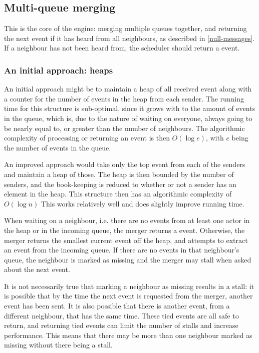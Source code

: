 \subsection{Multi-queue merging} \label{rustasim-tree}

This is the core of the engine: merging multiple queues together, and returning the next event if it has heard from all neighbours, as described in \ref{null-messages}.
If a neighbour has not been heard from, the scheduler should return a  event.

\subsubsection{An initial approach: heaps}
An initial approach might be to maintain a heap of all received event along with a counter for the number of events in the heap from each sender.
The running time for this structure is sub-optimal, since it grows with to the amount of events in the queue, which is, due to the nature of waiting on everyone, always going to be nearly equal to, or greater than the number of neighbours.
The algorithmic complexity of processing or returning an event is then $O(\log e)$, with $e$ being the number of events in the queue.

An improved approach would take only the top event from each of the senders and maintain a heap of those.
The heap is then bounded by the number of senders, and the book-keeping is reduced to whether or not a sender has an element in the heap.
This structure then has an algorithmic complexity of $O\left(\log n\right)$
This works relatively well and does slightly improve running time.

When waiting on a neighbour, i.e. there are no events from at least one actor in the heap or in the incoming queue, the merger returns a  event.
Otherwise, the merger returns the smallest current event off the heap, and attempts to extract an event from the incoming queue.
If there are no events in that neighbour's queue, the neighbour is marked as missing and the merger may stall when asked about the next event.

It is not necessarily true that marking a neighbour as missing results in a stall: it is possible that by the time the next event is requested from the merger, another event has been sent.
It is also possible that there is another event, from a different neighbour, that has the same time.
These tied events are all safe to return, and returning tied events can limit the number of stalls and increase performance.
This means that there may be more than one neighbour marked as missing without there being a stall.

